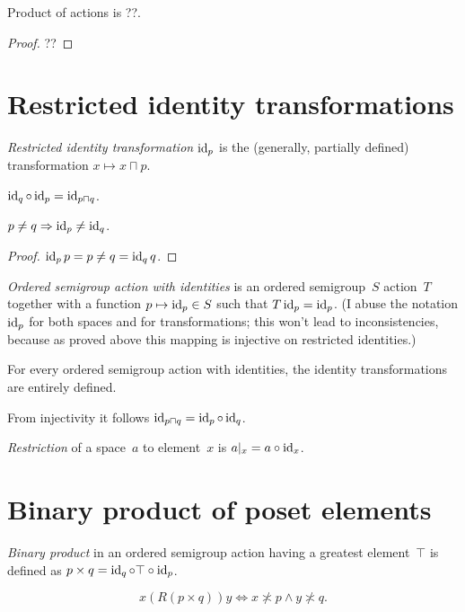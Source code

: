 Product of actions is ??.

\begin{proof}
??
\end{proof}

\section{Restricted identity transformations}

\emph{Restricted identity transformation} $\operatorname{id}_p$ is the (generally, partially defined) transformation $x\mapsto x\sqcap p$.

\begin{obvious}
$\operatorname{id}_q\circ\operatorname{id}_p = \operatorname{id}_{p\sqcap q}$.
\end{obvious}

\begin{prop}
$p\ne q\Rightarrow\operatorname{id}_p\ne\operatorname{id}_q$.
\end{prop}

\begin{proof}
$\operatorname{id}_p p=p \ne q = \operatorname{id}_q q$.
\end{proof}

\emph{Ordered semigroup action with identities} is an ordered semigroup~$S$ action~$T$ together with a function $p\mapsto\operatorname{id}_p\in S$ such that $T\operatorname{id}_p=\operatorname{id}_p$. (I abuse the notation $\operatorname{id}_p$ for both spaces and for transformations; this won't lead to inconsistencies, because as proved above this mapping is injective on restricted identities.)

\begin{obvious}
For every ordered semigroup action with identities, the identity transformations are entirely defined.
\end{obvious}

From injectivity it follows $\operatorname{id}_{p\sqcap q} = \operatorname{id}_p\circ\operatorname{id}_q$.

\emph{Restriction} of a space~$a$ to element~$x$ is $a|_x=a\circ\operatorname{id}_x$.

\section{Binary product of poset elements}

\emph{Binary product} in an ordered semigroup action having a greatest element~$\top$ is defined as $p\times q=\operatorname{id}_q\circ\top\circ\operatorname{id}_p$.

\begin{thm}
\[ x(R(p\times q))y\Leftrightarrow x\nasymp p\land y\nasymp q. \]
\end{thm}


